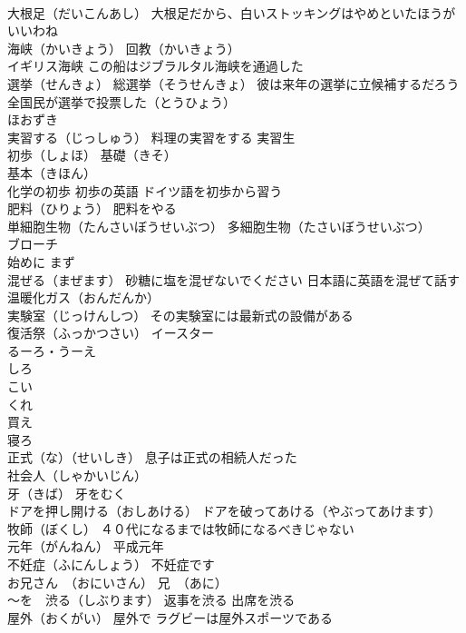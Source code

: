 \documentclass[8pt]{extreport}
\begin{document}
\begin{CJK}{UTF8}{min}
\\	大根足（だいこんあし） 大根足だから、白いストッキングはやめといたほうがいいわね
\\	海峡（かいきょう） 回教（かいきょう） 
\\	イギリス海峡 この船はジブラルタル海峡を通過した
\\	選挙（せんきょ） 総選挙（そうせんきょ） 彼は来年の選挙に立候補するだろう 全国民が選挙で投票した（とうひょう）
\\	ほおずき
\\	実習する（じっしゅう） 料理の実習をする 実習生
\\	初歩（しょほ） 基礎（きそ）
\\	基本（きほん）
\\	化学の初歩 初歩の英語 ドイツ語を初歩から習う
\\	肥料（ひりょう） 肥料をやる
\\	単細胞生物（たんさいぼうせいぶつ） 多細胞生物（たさいぼうせいぶつ）
\\	ブローチ
\\	始めに まず
\\	混ぜる（まぜます） 砂糖に塩を混ぜないでください 日本語に英語を混ぜて話す
\\	温暖化ガス（おんだんか）
\\	実験室（じっけんしつ） その実験室には最新式の設備がある
\\	復活祭（ふっかつさい） イースター
\\	るーろ・うーえ 
\\	しろ 
\\	こい 
\\	くれ 
\\	買え 
\\	寝ろ
\\	正式（な）（せいしき） 息子は正式の相続人だった
\\	社会人（しゃかいじん）
\\	牙（きば） 牙をむく
\\	ドアを押し開ける（おしあける） ドアを破ってあける（やぶってあけます）
\\	牧師（ぼくし） ４０代になるまでは牧師になるべきじゃない
\\	元年（がんねん） 平成元年
\\	不妊症（ふにんしょう） 不妊症です
\\	お兄さん　（おにいさん） 兄　（あに）
\\	～を　渋る（しぶります） 返事を渋る 出席を渋る
\\	屋外（おくがい） 屋外で ラグビーは屋外スポーツである

\end{CJK}
\end{document}
